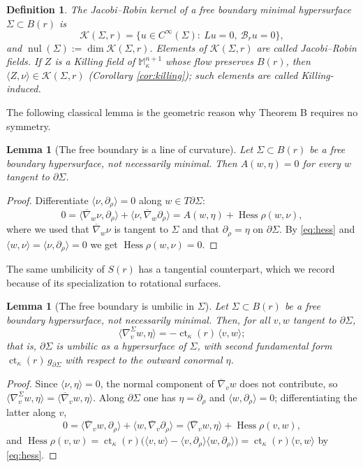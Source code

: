 \documentclass[10pt,a4paper]{amsart}
\newtheorem{lemma}[theorem]{Lemma}
\newtheorem{definition}[theorem]{Definition}
\newcommand{\M}{\mathbb{M}}
\newcommand{\ct}{\operatorname{ct}_\kappa}
\newcommand{\Hess}{\operatorname{Hess}}
\newcommand{\nul}{\operatorname{nul}}
\newcommand{\bconn}{\overline{\nabla}}
\newcommand{\Ker}{\mathcal{K}}
\begin{document}
\begin{definition}\label{def:kernel}
The \emph{Jacobi--Robin kernel} of a free boundary minimal hypersurface $\Sigma\subset B(r)$ is
\[
\Ker(\Sigma,r)=\{u\in C^\infty(\Sigma):\ Lu=0,\ \mathcal{B}_ru=0\},
\]
and $\nul(\Sigma):=\dim\Ker(\Sigma,r)$. Elements of $\Ker(\Sigma,r)$ are called \emph{Jacobi--Robin fields}. If $Z$ is a Killing field of $\M^{n+1}_\kappa$ whose flow preserves $B(r)$, then $\langle Z,\nu\rangle\in\Ker(\Sigma,r)$ (Corollary \ref{cor:killing}); such elements are called \emph{Killing-induced}.
\end{definition}

The following classical lemma is the geometric reason why Theorem B requires no symmetry.

\begin{lemma}[The free boundary is a line of curvature]\label{lem:curvline}
Let $\Sigma\subset B(r)$ be a free boundary hypersurface, not necessarily minimal. Then $A(w,\eta)=0$ for every $w$ tangent to $\partial\Sigma$.
\end{lemma}

\begin{proof}
Differentiate $\langle\nu,\partial_\rho\rangle=0$ along $w\in T\partial\Sigma$:
\[
0=\langle\bconn_w\nu,\partial_\rho\rangle+\langle\nu,\bconn_w\partial_\rho\rangle=A(w,\eta)+\Hess\rho(w,\nu),
\]
where we used that $\bconn_w\nu$ is tangent to $\Sigma$ and that $\partial_\rho=\eta$ on $\partial\Sigma$. By \eqref{eq:hess} and $\langle w,\nu\rangle=\langle\nu,\partial_\rho\rangle=0$ we get $\Hess\rho(w,\nu)=0$.
\end{proof}

The same umbilicity of $S(r)$ has a tangential counterpart, which we record because of its specialization to rotational surfaces.

\begin{lemma}[The free boundary is umbilic in $\Sigma$]\label{lem:bdryumbilic}
Let $\Sigma\subset B(r)$ be a free boundary hypersurface, not necessarily minimal. Then, for all $v,w$ tangent to $\partial\Sigma$,
\begin{equation}\label{eq:bdryumbilic}
\langle\nabla^\Sigma_vw,\eta\rangle=-\ct(r)\,\langle v,w\rangle ;
\end{equation}
that is, $\partial\Sigma$ is umbilic as a hypersurface of $\Sigma$, with second fundamental form $\ct(r)\,g_{\partial\Sigma}$ with respect to the outward conormal $\eta$.
\end{lemma}

\begin{proof}
Since $\langle\nu,\eta\rangle=0$, the normal component of $\bconn_vw$ does not contribute, so $\langle\nabla^\Sigma_vw,\eta\rangle=\langle\bconn_vw,\eta\rangle$. Along $\partial\Sigma$ one has $\eta=\partial_\rho$ and $\langle w,\partial_\rho\rangle=0$; differentiating the latter along $v$,
\[
0=\langle\bconn_vw,\partial_\rho\rangle+\langle w,\bconn_v\partial_\rho\rangle=\langle\bconn_vw,\eta\rangle+\Hess\rho(v,w),
\]
and $\Hess\rho(v,w)=\ct(r)\bigl(\langle v,w\rangle-\langle v,\partial_\rho\rangle\langle w,\partial_\rho\rangle\bigr)=\ct(r)\langle v,w\rangle$ by \eqref{eq:hess}.
\end{proof}
\end{document}
